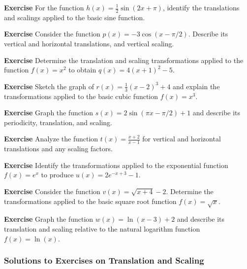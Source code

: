 \documentclass[a4paper,12pt]{book}
\newenvironment{exercise}[1][]
  {\par\medskip\noindent\textbf{Exercise #1} \rmfamily}
  {\medskip}
\begin{document}
\begin{exercise}
For the function \( h(x) = \frac{1}{2}\sin(2x + \pi) \), identify the translations and scalings applied to the basic sine function.
\end{exercise}

\begin{exercise}
Consider the function \( p(x) = -3\cos(x - \pi/2) \). Describe its vertical and horizontal translations, and vertical scaling.
\end{exercise}

\begin{exercise}
Determine the translation and scaling transformations applied to the function \( f(x) = x^2 \) to obtain \( q(x) = 4(x + 1)^2 - 5 \).
\end{exercise}

\begin{exercise}
Sketch the graph of \( r(x) = \frac{1}{3}(x - 2)^3 + 4 \) and explain the transformations applied to the basic cubic function \( f(x) = x^3 \).
\end{exercise}

\begin{exercise}
Graph the function \( s(x) = 2\sin(\pi x - \pi/2) + 1 \) and describe its periodicity, translation, and scaling.
\end{exercise}

\begin{exercise}
Analyze the function \( t(x) = \frac{x + 2}{x - 1} \) for vertical and horizontal translations and any scaling factors.
\end{exercise}

\begin{exercise}
Identify the transformations applied to the exponential function \( f(x) = e^x \) to produce \( u(x) = 2e^{-x + 3} - 1 \).
\end{exercise}

\begin{exercise}
Consider the function \( v(x) = \sqrt{x + 4} - 2 \). Determine the transformations applied to the basic square root function \( f(x) = \sqrt{x} \).
\end{exercise}

\begin{exercise}
Graph the function \( w(x) = \ln(x - 3) + 2 \) and describe its translation and scaling relative to the natural logarithm function \( f(x) = \ln(x) \).
\end{exercise}

\subsubsection*{Solutions to Exercises on Translation and Scaling}
\end{document}
